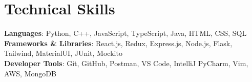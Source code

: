 \section{Technical Skills}
\begin{itemize}[leftmargin=0.15in, label={}]
    \small{\item{
        \textbf{Languages}{: Python, C++, JavaScript, TypeScript, Java, HTML, CSS, SQL} \\
     
        \textbf{Frameworks \& Libraries}{: React.js, Redux, Express.js, Node.js, Flask, Tailwind, MaterialUI, JUnit, Mockito} \\

        \textbf{Developer Tools}{: Git, GitHub, Postman, VS Code, IntelliJ PyCharm, Vim, AWS, MongoDB} \\
    }}
\end{itemize}